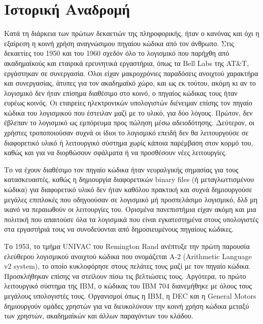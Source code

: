 \documentclass[a4paper, 11pt]{article}
\begin{document}
{\section{Ιστορική Αναδρομή}
Κατά τη διάρκεια των πρώτων δεκαετιών της πληροφορικής, ήταν ο κανόνας και όχι η εξαίρεση η κοινή χρήση αναγνώσιμου πηγαίου κώδικα από τον άνθρωπο. Στις δεκαετίες του 1950 και του 1960 σχεδόν όλο το λογισμικό που παρήχθη από ακαδημαϊκούς και εταιρικά ερευνητικά εργαστήρια, όπως τα \textlatin{Bell Labs} της  \textlatin{AT&T}, εργάστηκαν σε συνεργασία. Όλοι είχαν μακροχρόνιες παραδόσεις ανοιχτού χαρακτήρα και συνεργασίας, άτυπες για τον ακαδημαϊκό χώρο, και ως εκ τούτου, ακόμη κι αν το λογισμικό δεν ήταν επίσημα διαθέσιμο στο κοινό, ο πηγαίος κώδικας τους ήταν ευρέως κοινός. Οι εταιρείες ηλεκτρονικών υπολογιστών διένειμαν επίσης τον πηγαίο κώδικα του λογισμικού που έστειλαν μαζί με το υλικό, για δύο λόγους. Πρώτον, δεν έβλεπαν το λογισμικό ως εμπόρευμα προς πώληση μέσω αδειοδότησης. Δεύτερον, οι χρήστες τροποποιούσαν συχνά οι ίδιοι το λογισμικό επειδή δεν θα λειτουργούσε σε διαφορετικό υλικό ή λειτουργικό σύστημα χωρίς κάποια παρέμβαση στον κορμό του, καθώς και για να διορθώσουν σφάλματα ή να προσθέσουν νέες λειτουργίες.

Το να έχουν διαθέσιμο τον πηγαίο κώδικα ήταν νευραλγικής σημασίας για τους κατασκευαστές, καθώς η δημιουργία διαφορετικών \textlatin{binary files} (ή μεταγλωττισμένου κώδικα) για διαφορετικό υλικό δεν ήταν καθόλου πρακτική και 
συχνά δημιουργούσε μεγάλες επιπλοκές που οδηγοούσαν σε λογισμικό μή προσπελάσιμο λογισμικό, δλδ μη ικανό να περαιωθούν οι λειτουργίες του. Ορισμένα πανεπιστήμια είχαν ακόμη και μια πολιτική που απαιτούσε όλα τα λογισμικά που είναι εγκατεστημένα στους υπολογιστές στα εργαστήριά τους να συνοδεύονται από δημοσιευμένους πηγαίους κώδικες.

Το 1953, το τμήμα \textlatin{UNIVAC} του \textlatin{Remington Rand} ανέπτυξε την πρώτη παρουσία ελεύθερου λογισμικού ανοιχτού κώδικα που ονομάζεται  \textlatin{A-2 (Arithmetic Language v2 system)}, το οποίο κυκλοφόρησε στους πελάτες τους μαζί με τον πηγαίο κώδικα. Προσκλήθηκαν επίσης να στείλουν πίσω τις βελτιώσεις τους. Αργότερα, το πρώτο λειτουργικό σύστημα της  \textlatin{IBM}, ο κώδικας του  \textlatin{IBM 704} διανεμήθηκε με όλους τους μεγάλους υπολογιστές τους. Οργανισμοί όπως η \textlatin{IBM}, η \textlatin{DEC} και η \textlatin{General Motors} δημιουργούν ομάδες χρηστών για να διευκολύνουν την κοινή χρήση κώδικα μεταξύ των χρηστών, ακαδημαϊκών και άλλων
παραγόντων του κλάδου. 

}
\end{document}
